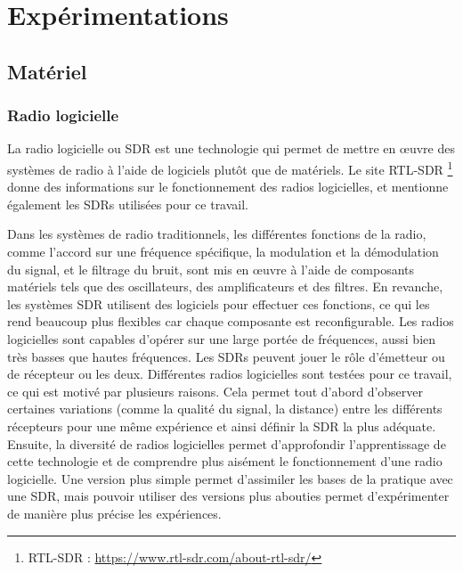 \chapter{Expérimentations}


\renewcommand{\leftmark}{EXPERIMENTATIONS}

\section{Matériel}

\subsection{Radio logicielle}

La radio logicielle ou \ac{SDR} est une technologie qui permet de mettre en œuvre des systèmes de radio à l'aide de logiciels plutôt que de matériels. Le site RTL-SDR \footnote{RTL-SDR : \href{https://www.rtl-sdr.com/about-rtl-sdr/}{https://www.rtl-sdr.com/about-rtl-sdr/}} donne des informations sur le fonctionnement des radios logicielles, et mentionne également les SDRs utilisées pour ce travail.

\vspace{0.1cm}

Dans les systèmes de radio traditionnels, les différentes fonctions de la radio, comme l'accord sur une fréquence spécifique, la modulation et la démodulation du signal, et le filtrage du bruit, sont mis en œuvre à l'aide de composants matériels tels que des oscillateurs, des amplificateurs et des filtres. En revanche, les systèmes \ac{SDR} utilisent des logiciels pour effectuer ces fonctions, ce qui les rend beaucoup plus flexibles car chaque composante est reconfigurable. Les radios logicielles sont capables d'opérer sur une large portée de fréquences, aussi bien très basses que hautes fréquences.
Les \ac{SDR}s peuvent jouer le rôle d'émetteur ou de récepteur ou les deux. Différentes radios logicielles sont testées pour ce travail, ce qui est motivé par plusieurs raisons. Cela permet tout d'abord d'observer certaines variations (comme la qualité du signal, la distance) entre les différents récepteurs pour une même expérience et ainsi définir la \ac{SDR} la plus adéquate. Ensuite, la diversité de radios logicielles permet d'approfondir l'apprentissage de cette technologie et de comprendre plus aisément le fonctionnement d'une radio logicielle. Une version plus simple permet d'assimiler les bases de la pratique avec une \ac{SDR}, mais pouvoir utiliser des versions plus abouties permet d'expérimenter de manière plus précise les expériences.

